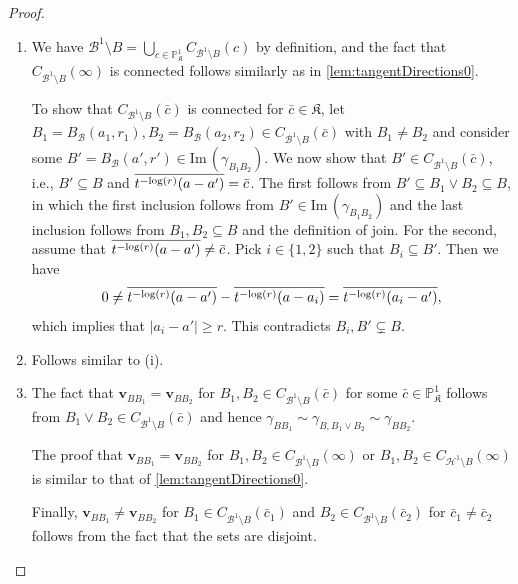 \documentclass[10pt]{article}
\theoremstyle{definition}
\def\log{{\rm log}}
\newcommand{\PP}{\mathbb{P}}
\renewcommand{\Im}{\mathrm{Im} \,}
\renewcommand{\vec}[1]{\mathbf{#1}}
\begin{document}
\begin{proof}\
  \begin{enumerate}
  \item[(i)] We have $\mathcal B^1\setminus B = \bigcup_{c\in\PP_{\mathfrak K}^1} C_{\mathcal B^1\setminus B}(c)$ by definition, and the fact that $C_{\mathcal B^1\setminus B}(\infty)$ is connected follows similarly as in \cref{lem:tangentDirections0}.

    To show that $C_{\mathcal B^1\setminus B}(\bar c)$ is connected for $\bar c\in\mathfrak K$, let $B_1=B_{\mathcal{B}}(a_1,r_1), B_2=B_{\mathcal{B}}(a_2,r_2) \in C_{\mathcal B^1\setminus B}(\bar c)$ with $B_1\neq B_2$ and consider some $B'=B_{\mathcal{B}}(a',r')\in\Im(\gamma_{B_1B_2})$.  We now show that $B'\in C_{\mathcal B^1\setminus B}(\bar c)$, i.e., $B'\subseteq B$ and $\overline{t^{-\log(r)}(a-a')}=\bar c$.  The first follows from $B'\subseteq B_1\vee B_2\subseteq B$, in which the first inclusion follows from $B'\in\Im(\gamma_{B_1B_2})$ and the last inclusion follows from $B_1,B_2\subseteq B$ and the definition of join.  For the second, assume that $\overline{t^{-\log(r)}(a-a')}\neq \bar c$.  Pick $i\in\{1,2\}$ such that $B_i\subseteq B'$. Then we have
    \begin{equation*}
      0\neq \overline{t^{-\log(r)}(a-a')} - \overline{t^{-\log(r)}(a-a_i)} =\overline{t^{-\log(r)}(a_i-a')},
    \end{equation*}
    which implies that $|a_i-a'|\geq r$.  This contradicts $B_i,B'\subsetneq B$.
  \item[(ii)] Follows similar to (i).
  \item[(iii)] The fact that $\vec{v}_{B B_1}= \vec{v}_{B B_2}$ for $B_1, B_2\in C_{\mathcal B^1\setminus B}(\bar c)$ for some $\bar c\in\PP_{\mathfrak K}^1$ follows from $B_1\vee B_2\in C_{\mathcal B^1\setminus B}(\bar c)$ and hence $\gamma_{B B_1}\sim \gamma_{B,B_1\vee B_2} \sim \gamma_{B B_2}$.

    The proof that $\vec{v}_{B B_1}= \vec{v}_{B B_2}$ for $B_1, B_2\in C_{\mathcal B^1\setminus B}(\infty)$ or $B_1, B_2\in C_{\mathcal H^1\setminus B}(\infty)$ is similar to that of \cref{lem:tangentDirections0}.

    Finally, $\vec{v}_{B B_1}\neq \vec{v}_{B B_2}$ for $B_1\in C_{\mathcal B^1\setminus B}(\bar c_1)$ and $B_2\in C_{\mathcal B^1\setminus B}(\bar c_2)$ for $\bar c_1\neq \bar c_2$ follows from the fact that the sets are disjoint. \qedhere
  \end{enumerate}
\end{proof}
\end{document}
